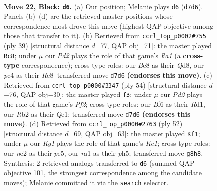 \documentclass[11pt]{article}
\begin{document}
\clearpage

\begin{figure}[p]\centering
\begin{subfigure}{0.46\textwidth}\centering
\resizebox{\linewidth}{!}{%
\newchessgame
\chessboard[
  setfen={2bqr1k1/p2ppp2/P4b1B/2p2P1Q/2P1B3/6P1/1r2N2K/R4R2 b - - 0 22},
  showmover=false,
  pgfstyle=straightmove, color=movearrow, markmove={d7-d6}
]}
\caption{}
\end{subfigure}\hfill
\begin{subfigure}{0.46\textwidth}\centering
\resizebox{\linewidth}{!}{%
\newchessgame
\chessboard[
  setfen={r2qr3/1p3ppk/p3b3/P2p4/1P1Q1B2/7P/5PP1/R3R1K1 b - - 0 20},
  showmover=false,
  pgfstyle=straightmove, color=movearrow, markmove={a8-c8}
]}
\caption{}
\end{subfigure}
\\[4pt]
\begin{subfigure}{0.46\textwidth}\centering
\resizebox{\linewidth}{!}{%
\newchessgame
\chessboard[
  setfen={5rk1/4q3/2rpb2p/P3ppp1/8/2P3BP/3R1PP1/3RQ1K1 w - - 2 28},
  showmover=false,
  pgfstyle=straightmove, color=movearrow, markmove={f2-f3}
]}
\caption{}
\end{subfigure}\hfill
\begin{subfigure}{0.46\textwidth}\centering
\resizebox{\linewidth}{!}{%
\newchessgame
\chessboard[
  setfen={1r3r1k/4qpp1/3p4/1P1Rp1Pp/2B1Pb1P/1Q6/5P2/4K2R w K - 1 27},
  showmover=false,
  pgfstyle=straightmove, color=movearrow, markmove={e1-f1}
]}
\caption{}
\end{subfigure}
\caption{\textbf{Move 22, Black: \texttt{d6}.} (a) Our position; Melanie plays \texttt{d6} (\texttt{d7d6}). Panels (b)--(d) are the retrieved master positions whose correspondence most drove this move (highest QAP objective among those that transfer to it). (b) Retrieved from \texttt{ccrl\_top\_p0002\#755} (ply 39) [structural distance $d$=77, QAP obj=71]: the master played \texttt{Rc8}; under $\mu$ our \emph{Pd2} plays the role of that game's \emph{Ra1} (a \textbf{cross-type} correspondence); cross-type roles: our \emph{B}c8 as their \emph{Q}d8, our \emph{p}c4 as their \emph{R}e8; transferred move \texttt{d7d6} \textbf{(endorses this move)}. (c) Retrieved from \texttt{ccrl\_top\_p0000\#3347} (ply 54) [structural distance $d$=76, QAP obj=30]: the master played \texttt{f3}; under $\mu$ our \emph{Pd2} plays the role of that game's \emph{Pf2}; cross-type roles: our \emph{B}f6 as their \emph{R}d1, our \emph{R}b2 as their \emph{Q}e1; transferred move \texttt{d7d6} \textbf{(endorses this move)}. (d) Retrieved from \texttt{ccrl\_top\_p0000\#2763} (ply 52) [structural distance $d$=69, QAP obj=63]: the master played \texttt{Kf1}; under $\mu$ our \emph{Kg1} plays the role of that game's \emph{Ke1}; cross-type roles: our \emph{n}e2 as their \emph{p}e5, our \emph{r}a1 as their \emph{p}h5; transferred move \texttt{g8h8}. Synthesis: 2 retrieved analogs transferred to \texttt{d6} (summed QAP objective 101, the strongest correspondence among the candidate moves); Melanie committed it via the \texttt{search} selector.}
\label{fig:thought-m43}
\end{figure}
\end{document}
